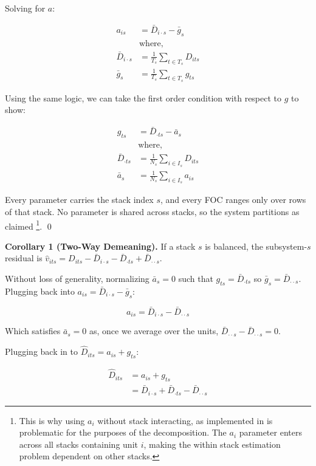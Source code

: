 \documentclass[12pt]{article}
\begin{document}
Solving for $a$:

\begin{align*}
    a_{is} &= \bar{D}_{i \cdot s} - \bar{g}_s \\
    &\text{where,} \\
    \bar{D}_{i \cdot s} &= \frac{1}{T_s} \sum_{t \in  T_s} D_{its} \\
    \bar{g}_s &= \frac{1}{T_s} \sum_{t \in  T_s} g_{ts}
\end{align*}

Using the same logic, we can take the first order condition with respect to $g$ to show:

\begin{align*}
     g_{ts} &= \bar{D}_{\cdot t s} - \bar{a}_s \\
    &\text{where,} \\
    \bar{D}_{\cdot t s} &= \frac{1}{N_s} \sum_{i \in  I_s} D_{its} \\
    \bar{a}_s &= \frac{1}{N_s} \sum_{i \in I_s} a_{is}
\end{align*}

Every parameter carries the stack index $s$, and every FOC ranges only over rows of that stack. No parameter is shared across stacks, so the system partitions as claimed \footnote{This is why using $a_i$ without stack interacting, as implemented in \textcite{payson2025residency} is problematic for the purposes of the decomposition. The $a_i$ parameter enters across all stacks containing unit $i$, making the within stack estimation problem dependent on other stacks.}. \qed 

\textbf{Corollary 1 (Two-Way Demeaning).} If a stack $s$ is balanced, the subsystem-$s$ residual is $\hat{v}_{its} = D_{its} - \bar{D}_{i \cdot s} - \bar{D}_{\cdot ts} + \bar{D}_{\cdot \cdot s}$.

Without loss of generality, normalizing $\bar{a}_s = 0$ such that $g_{ts} = \bar{D}_{\cdot t s}$ so $\bar{g}_s = \bar{D}_{\cdot \cdot s}$. Plugging back into $a_{is} = \bar{D}_{i \cdot s} - \bar{g}_s$:

\begin{equation*}
    a_{is} = \bar{D}_{i \cdot s} - \bar{D}_{\cdot \cdot s}
\end{equation*}

Which satisfies $\bar{a}_s = 0$ as, once we average over the units, $\bar{D}_{\cdot \cdot s} - \bar{D}_{\cdot \cdot s} = 0$.

Plugging back in to $\hat{D}_{its} = a_{is} + g_{ts}$:

\begin{align*}
    \hat{D}_{its} &= a_{is} + g_{ts} \\
    &= \bar{D}_{i \cdot s} + \bar{D}_{\cdot t s} - \bar{D}_{\cdot \cdot s}
\end{align*}
\end{document}
